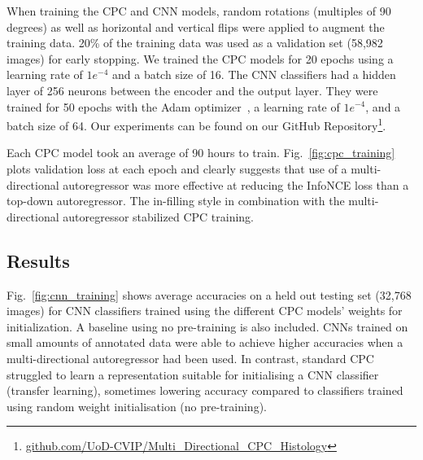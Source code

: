 When training the CPC and CNN models, random rotations (multiples of 90 degrees) as well as horizontal and vertical flips were applied to augment the training data. 20\% of the training data was used as a validation set (58,982 images) for early stopping. We trained the CPC models for 20 epochs using a learning rate of \(1e^{-4}\) and a batch size of 16. The CNN classifiers had a hidden layer of 256 neurons between the encoder and the output layer. They were trained for 50 epochs with the Adam optimizer~\cite{kingma2014adam}, a learning rate of \(1e^{-4}\), and a batch size of 64. Our experiments can be found on our GitHub Repository\footnote{\url{github.com/UoD-CVIP/Multi_Directional_CPC_Histology}}.

Each CPC model took an average of 90 hours to train. Fig.~\ref{fig:cpc_training} plots validation loss at each epoch and clearly suggests that use of a multi-directional autoregressor was more effective at reducing the InfoNCE loss than a top-down autoregressor. The in-filling style in combination with the multi-directional autoregressor stabilized CPC training.

\subsection{Results}
\label{subsec:unsupervised_results}
Fig.~\ref{fig:cnn_training} shows average accuracies on a held out testing set (32,768 images) for CNN classifiers trained using the different CPC models' weights for initialization. A baseline using no pre-training is also included. CNNs trained on small amounts of annotated data were able to achieve higher accuracies when a multi-directional autoregressor had been used.  In contrast, standard CPC struggled to learn a representation suitable for initialising a CNN classifier (transfer learning), sometimes lowering accuracy compared to classifiers trained using random weight initialisation (no pre-training).

